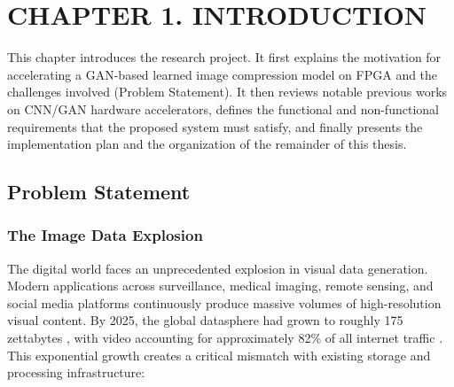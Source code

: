 \section*{CHAPTER 1. INTRODUCTION}
\setcounter{section}{1}
\setcounter{subsection}{0}
\setcounter{subsubsection}{0}
\setcounter{figure}{0}
\setcounter{table}{0}

This chapter introduces the research project. It first explains the motivation for accelerating a GAN-based learned image compression model on FPGA and the challenges involved (Problem Statement). It then reviews notable previous works on CNN/GAN hardware accelerators, defines the functional and non-functional requirements that the proposed system must satisfy, and finally presents the implementation plan and the organization of the remainder of this thesis.

\subsection{Problem Statement}

\subsubsection*{The Image Data Explosion}

The digital world faces an unprecedented explosion in visual data generation. Modern applications across surveillance, medical imaging, remote sensing, and social media platforms continuously produce massive volumes of high-resolution visual content. By 2025, the global datasphere had grown to roughly 175 zettabytes \cite{idc2020dataage}, with video accounting for approximately 82\% of all internet traffic \cite{explodingtopics2025}. This exponential growth creates a critical mismatch with existing storage and processing infrastructure:


